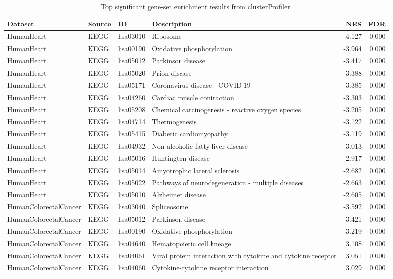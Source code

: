 \begin{table}[htbp]
\centering
\caption{Top significant gene-set enrichment results from clusterProfiler.}
\label{tab:top-gsea}
\begin{tabular}{llllrr}
\toprule
Dataset & Source & ID & Description & NES & FDR
 \\
\midrule
HumanHeart & KEGG & hsa03010 & Ribosome & -4.127 & 0.000
 \\
HumanHeart & KEGG & hsa00190 & Oxidative phosphorylation & -3.964 & 0.000
 \\
HumanHeart & KEGG & hsa05012 & Parkinson disease & -3.417 & 0.000
 \\
HumanHeart & KEGG & hsa05020 & Prion disease & -3.388 & 0.000
 \\
HumanHeart & KEGG & hsa05171 & Coronavirus disease - COVID-19 & -3.385 & 0.000
 \\
HumanHeart & KEGG & hsa04260 & Cardiac muscle contraction & -3.303 & 0.000
 \\
HumanHeart & KEGG & hsa05208 & Chemical carcinogenesis - reactive oxygen species & -3.205 & 0.000
 \\
HumanHeart & KEGG & hsa04714 & Thermogenesis & -3.122 & 0.000
 \\
HumanHeart & KEGG & hsa05415 & Diabetic cardiomyopathy & -3.119 & 0.000
 \\
HumanHeart & KEGG & hsa04932 & Non-alcoholic fatty liver disease & -3.013 & 0.000
 \\
HumanHeart & KEGG & hsa05016 & Huntington disease & -2.917 & 0.000
 \\
HumanHeart & KEGG & hsa05014 & Amyotrophic lateral sclerosis & -2.682 & 0.000
 \\
HumanHeart & KEGG & hsa05022 & Pathways of neurodegeneration - multiple diseases & -2.663 & 0.000
 \\
HumanHeart & KEGG & hsa05010 & Alzheimer disease & -2.605 & 0.000
 \\
HumanColorectalCancer & KEGG & hsa03040 & Spliceosome & -3.592 & 0.000
 \\
HumanColorectalCancer & KEGG & hsa05012 & Parkinson disease & -3.421 & 0.000
 \\
HumanColorectalCancer & KEGG & hsa00190 & Oxidative phosphorylation & -3.219 & 0.000
 \\
HumanColorectalCancer & KEGG & hsa04640 & Hematopoietic cell lineage & 3.108 & 0.000
 \\
HumanColorectalCancer & KEGG & hsa04061 & Viral protein interaction with cytokine and cytokine receptor & 3.051 & 0.000
 \\
HumanColorectalCancer & KEGG & hsa04060 & Cytokine-cytokine receptor interaction & 3.029 & 0.000
 \\
\bottomrule
\end{tabular}
\end{table}
